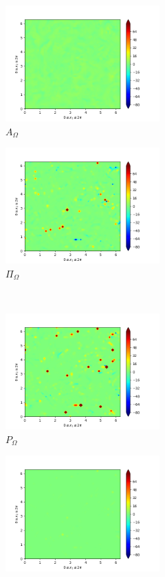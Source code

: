 \begin{figure}[H]
\begin{subfigure}{0.45\textwidth}
        \includegraphics[height=1.75in]{media/run-cds-65/A-enst-1360.png}
        \caption{$A_{\Omega}$}
    \end{subfigure}
    \newline
    \begin{subfigure}{0.45\textwidth}
        \includegraphics[height=1.75in]{media/run-cds-65/Pi-enst-1360.png}
        \caption{$\Pi_{\Omega}$}
    \end{subfigure}
    ~
    \begin{subfigure}{0.45\textwidth}
        \includegraphics[height=1.75in]{media/run-cds-65/P-enst-1360.png}
        \caption{$P_{\Omega}$}
    \end{subfigure}
    \newline
    \begin{subfigure}{0.45\textwidth}
        \includegraphics[height=1.75in]{media/run-cds-65/B-enst-1360.png}

\end{subfigure}
\end{figure}
